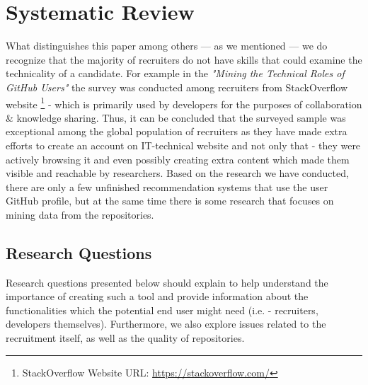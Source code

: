 \section{Systematic Review}
\label{sec:systematic-review}

What distinguishes this paper among others — as we mentioned — we do recognize that the majority of recruiters do not have skills that could examine the technicality of a candidate. For example in the \emph{"Mining the Technical Roles of GitHub Users"} the survey was conducted among recruiters from StackOverflow website \footnote{StackOverflow Website URL: \url{https://stackoverflow.com/}} - which is primarily used by developers for the purposes of collaboration \& knowledge sharing. Thus, it can be concluded that the surveyed sample was exceptional among the global population of recruiters as they have made extra efforts to create an account on IT-technical website and not only that - they were actively browsing it and even possibly creating extra content which made them visible and reachable by researchers. Based on the research we have conducted, there are only a few unfinished recommendation systems that use the user GitHub profile, but at the same time there is some research that focuses on mining data from the repositories.

\subsection{Research Questions}
Research questions presented below should explain to help understand the importance of creating such a tool and provide information about the functionalities which the potential end user might need (i.e. - recruiters, developers themselves). Furthermore, we also explore issues related to the recruitment itself, as well as the quality of repositories.


